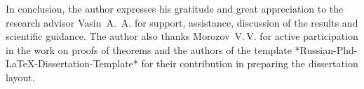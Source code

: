 In conclusion, the author expresses his gratitude and great appreciation to the research advisor Vasin~A.\, A. for support, assistance, discussion of the results and scientific guidance. The author also thanks Morozov~V.\,V. for active participation in the work on proofs of theorems and the authors of the template *Russian-Phd-LaTeX-Dissertation-Template* for their contribution in preparing the dissertation layout. %
